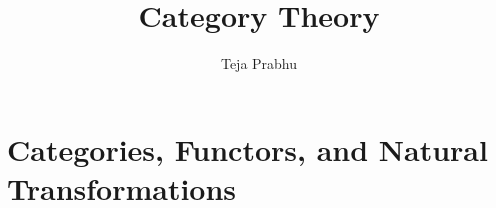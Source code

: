 \documentclass[11pt]{article}
\title{\textbf{Category Theory}}
\author{Teja Prabhu}
\date{}
\begin{document}
\maketitle
\newpage
\tableofcontents
\newpage

\section{Categories, Functors, and Natural Transformations}





\end{document}
